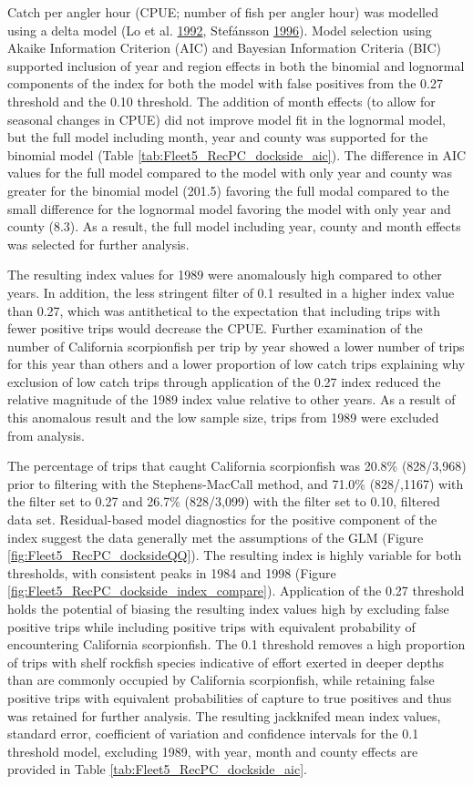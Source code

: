 \documentclass[12pt,]{article}
\begin{document}
Catch per angler hour (CPUE; number of fish per angler hour) was
modelled using a delta model (Lo et al.
\protect\hyperlink{ref-Lo1992}{1992}, Stefánsson
\protect\hyperlink{ref-Stefansson1996}{1996}). Model selection using
Akaike Information Criterion (AIC) and Bayesian Information Criteria
(BIC) supported inclusion of year and region effects in both the
binomial and lognormal components of the index for both the model with
false positives from the 0.27 threshold and the 0.10 threshold. The
addition of month effects (to allow for seasonal changes in CPUE) did
not improve model fit in the lognormal model, but the full model
including month, year and county was supported for the binomial model
(Table \ref{tab:Fleet5_RecPC_dockside_aic}). The difference in AIC
values for the full model compared to the model with only year and
county was greater for the binomial model (201.5) favoring the full
modal compared to the small difference for the lognormal model favoring
the model with only year and county (8.3). As a result, the full model
including year, county and month effects was selected for further
analysis.

The resulting index values for 1989 were anomalously high compared to
other years. In addition, the less stringent filter of 0.1 resulted in a
higher index value than 0.27, which was antithetical to the expectation
that including trips with fewer positive trips would decrease the CPUE.
Further examination of the number of California scorpionfish per trip by
year showed a lower number of trips for this year than others and a
lower proportion of low catch trips explaining why exclusion of low
catch trips through application of the 0.27 index reduced the relative
magnitude of the 1989 index value relative to other years. As a result
of this anomalous result and the low sample size, trips from 1989 were
excluded from analysis.

The percentage of trips that caught California scorpionfish was 20.8\%
(828/3,968) prior to filtering with the Stephens-MacCall method, and
71.0\% (828/,1167) with the filter set to 0.27 and 26.7\% (828/3,099)
with the filter set to 0.10, filtered data set. Residual-based model
diagnostics for the positive component of the index suggest the data
generally met the assumptions of the GLM (Figure
\ref{fig:Fleet5_RecPC_docksideQQ}). The resulting index is highly
variable for both thresholds, with consistent peaks in 1984 and 1998
(Figure \ref{fig:Fleet5_RecPC_dockside_index_compare}). Application of
the 0.27 threshold holds the potential of biasing the resulting index
values high by excluding false positive trips while including positive
trips with equivalent probability of encountering California
scorpionfish. The 0.1 threshold removes a high proportion of trips with
shelf rockfish species indicative of effort exerted in deeper depths
than are commonly occupied by California scorpionfish, while retaining
false positive trips with equivalent probabilities of capture to true
positives and thus was retained for further analysis. The resulting
jackknifed mean index values, standard error, coefficient of variation
and confidence intervals for the 0.1 threshold model, excluding 1989,
with year, month and county effects are provided in Table
\ref{tab:Fleet5_RecPC_dockside_aic}.
\end{document}
